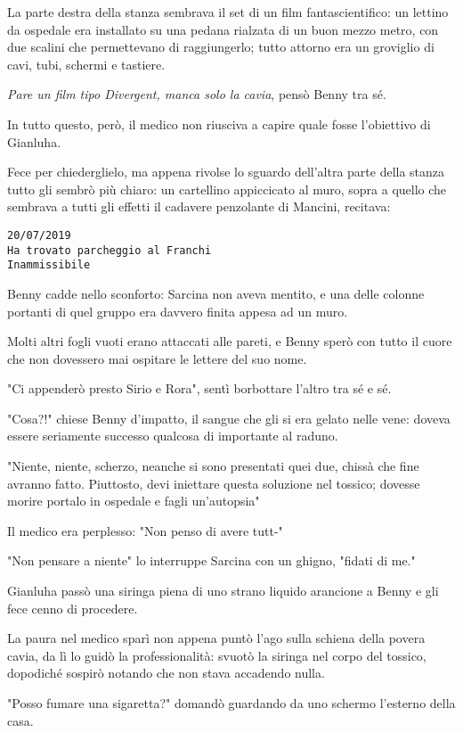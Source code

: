 La parte destra della stanza sembrava il set di un film fantascientifico: un lettino da ospedale era installato su una pedana rialzata di un buon mezzo metro, con due scalini che permettevano di raggiungerlo; tutto attorno era un groviglio di cavi, tubi, schermi e tastiere.

\textit{Pare un film tipo Divergent, manca solo la cavia}, pensò Benny tra sé.

In tutto questo, però, il medico non riusciva a capire quale fosse l'obiettivo di Gianluha.

Fece per chiederglielo, ma appena rivolse lo sguardo dell'altra parte della stanza tutto gli sembrò più chiaro: un cartellino appiccicato al muro, sopra a quello che sembrava a tutti gli effetti il cadavere penzolante di Mancini, recitava:

\begin{lstlisting}
20/07/2019
Ha trovato parcheggio al Franchi
Inammissibile
\end{lstlisting}

Benny cadde nello sconforto: Sarcina non aveva mentito, e una delle colonne portanti di quel gruppo era davvero finita appesa ad un muro.

Molti altri fogli vuoti erano attaccati alle pareti, e Benny sperò con tutto il cuore che non dovessero mai ospitare le lettere del suo nome.

"Ci appenderò presto Sirio e Rora", sentì borbottare l'altro tra sé e sé.

"Cosa?!" chiese Benny d'impatto, il sangue che gli si era gelato nelle vene: doveva essere seriamente successo qualcosa di importante al raduno.

"Niente, niente, scherzo, neanche si sono presentati quei due, chissà che fine avranno fatto. Piuttosto, devi iniettare questa soluzione nel tossico; dovesse morire portalo in ospedale e fagli un'autopsia"

Il medico era perplesso: "Non penso di avere tutt-"

"Non pensare a niente" lo interruppe Sarcina con un ghigno, "fidati di me."

Gianluha passò una siringa piena di uno strano liquido arancione a Benny e gli fece cenno di procedere.

La paura nel medico sparì non appena puntò l'ago sulla schiena della povera cavia, da lì lo guidò la professionalità: svuotò la siringa nel corpo del tossico, dopodiché sospirò notando che non stava accadendo nulla.

"Posso fumare una sigaretta?" domandò guardando da uno schermo l'esterno della casa.

